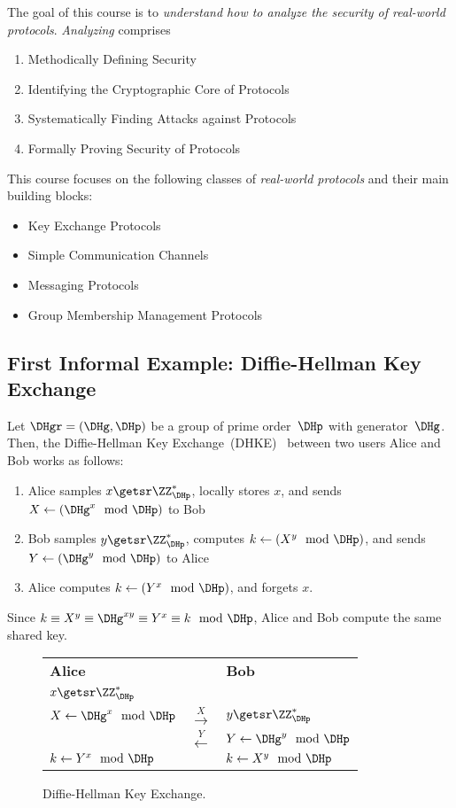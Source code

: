 \documentclass[a4paper,orivec]{llncs}
\begin{document}
The goal of this course is to \emph{understand how to analyze the security of real-world protocols}.
\emph{Analyzing} comprises
\begin{enumerate}
    \item Methodically Defining Security
    \item Identifying the Cryptographic Core of Protocols
    \item Systematically Finding Attacks against Protocols
    \item Formally Proving Security of Protocols
\end{enumerate}
This course focuses on the following classes of \emph{real-world protocols} and their main building blocks:
\begin{itemize}
    \item Key Exchange Protocols
    \item Simple Communication Channels
    \item Messaging Protocols
    \item Group Membership Management Protocols
\end{itemize}

\subsection{First Informal Example: Diffie-Hellman Key Exchange}
Let $\DHgr=(\DHg,\DHp)$ be a group of prime order~$\DHp$ with generator~$\DHg$.
Then, the Diffie-Hellman Key Exchange~(DHKE)~\cite{DifHel76} between two users Alice and Bob works as follows:
\begin{enumerate}
    \item Alice samples $x\getsr\ZZ_\DHp^*$, locally stores $x$, and sends $X\gets(\DHg^x\mod\DHp)$ to Bob
    \item Bob samples $y\getsr\ZZ_\DHp^*$, computes $k\gets(X^y\mod\DHp)$, and sends $Y\gets(\DHg^y\mod\DHp)$ to Alice
    \item Alice computes $k\gets(Y^x\mod\DHp)$, and forgets $x$.
\end{enumerate}
Since $k\equiv X^y\equiv\DHg^{xy}\equiv Y^x\equiv k\mod \DHp$, Alice and Bob compute the same shared key.

\begin{figure}
    \centering
    \begin{tabular}{lC{3cm}l}
         \textbf{Alice} & & \textbf{Bob}\\
         $x\getsr\ZZ_\DHp^*$ & &\\
         $X\gets\DHg^x\mod\DHp$ & $\xrightarrow{X}$ & $y\getsr\ZZ_\DHp^*$\\
         & $\xleftarrow{Y}$ & $Y\gets \DHg^y\mod\DHp$\\
         $k\gets Y^x\mod\DHp$ & & $k\gets X^y\mod\DHp$\\
    \end{tabular}
    \caption{Diffie-Hellman Key Exchange.}
    \label{fig:dhke}
\end{figure}
\end{document}
